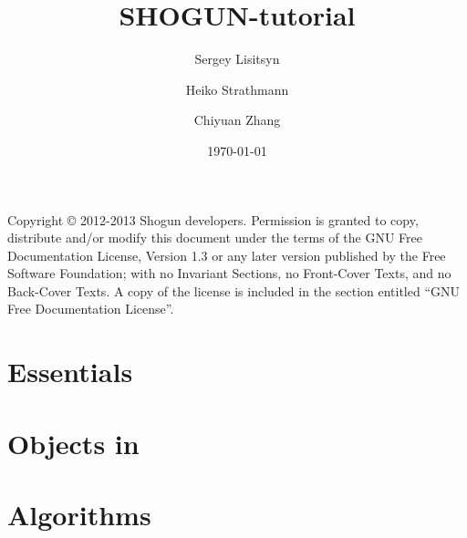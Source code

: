 \documentclass{shogun_tutorial}
\title{SHOGUN-tutorial}
\date{\today}
\author
{
Sergey Lisitsyn \and 
Heiko Strathmann\and 
Chiyuan Zhang \and 
}
\begin{document}
	\maketitle
	Copyright \copyright{}  2012-2013 Shogun developers.
    Permission is granted to copy, distribute and/or modify this document
    under the terms of the GNU Free Documentation License, Version 1.3
    or any later version published by the Free Software Foundation;
    with no Invariant Sections, no Front-Cover Texts, and no Back-Cover Texts.
    A copy of the license is included in the section entitled ``GNU
    Free Documentation License''.
    
    
	\tableofcontents
	\listoftodos
	\part{Essentials}
	
	
	\part{Objects in \shogun{}}
	
	
	
	\part{Algorithms}
	
	
	
	
	
	
	\begin{appendix}
	
	\end{appendix}
	
	
	 
\end{document}
